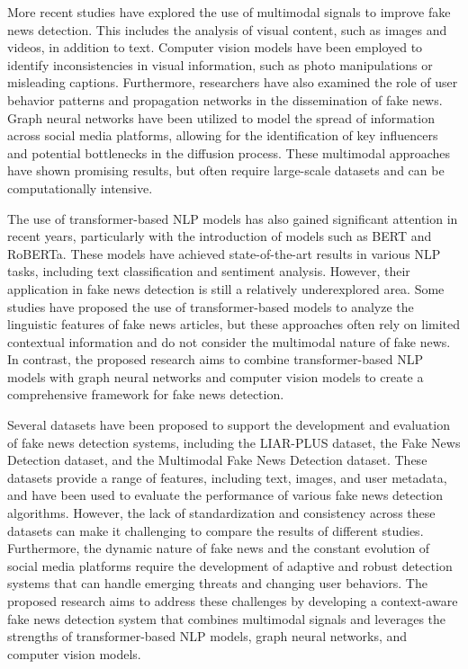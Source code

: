 \documentclass[conference]{IEEEtran}
\begin{document}
More recent studies have explored the use of multimodal signals to improve fake news detection. This includes the analysis of visual content, such as images and videos, in addition to text. Computer vision models have been employed to identify inconsistencies in visual information, such as photo manipulations or misleading captions. Furthermore, researchers have also examined the role of user behavior patterns and propagation networks in the dissemination of fake news. Graph neural networks have been utilized to model the spread of information across social media platforms, allowing for the identification of key influencers and potential bottlenecks in the diffusion process. These multimodal approaches have shown promising results, but often require large-scale datasets and can be computationally intensive.

The use of transformer-based NLP models has also gained significant attention in recent years, particularly with the introduction of models such as BERT and RoBERTa. These models have achieved state-of-the-art results in various NLP tasks, including text classification and sentiment analysis. However, their application in fake news detection is still a relatively underexplored area. Some studies have proposed the use of transformer-based models to analyze the linguistic features of fake news articles, but these approaches often rely on limited contextual information and do not consider the multimodal nature of fake news. In contrast, the proposed research aims to combine transformer-based NLP models with graph neural networks and computer vision models to create a comprehensive framework for fake news detection.

Several datasets have been proposed to support the development and evaluation of fake news detection systems, including the LIAR-PLUS dataset, the Fake News Detection dataset, and the Multimodal Fake News Detection dataset. These datasets provide a range of features, including text, images, and user metadata, and have been used to evaluate the performance of various fake news detection algorithms. However, the lack of standardization and consistency across these datasets can make it challenging to compare the results of different studies. Furthermore, the dynamic nature of fake news and the constant evolution of social media platforms require the development of adaptive and robust detection systems that can handle emerging threats and changing user behaviors. The proposed research aims to address these challenges by developing a context-aware fake news detection system that combines multimodal signals and leverages the strengths of transformer-based NLP models, graph neural networks, and computer vision models.
\end{document}
